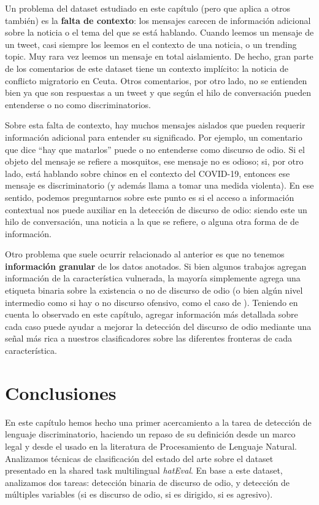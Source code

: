 
Un problema del dataset estudiado en este capítulo (pero que aplica a otros también) es la \textbf{falta de contexto}: los mensajes carecen de información adicional sobre la noticia o el tema del que se está hablando. Cuando leemos un mensaje de un tweet, casi siempre los leemos en el contexto de una noticia, o un trending topic. Muy rara vez leemos un mensaje en total aislamiento. De hecho, gran parte de los comentarios de este dataset tiene un contexto implícito: la noticia de conflicto migratorio en Ceuta. Otros comentarios, por otro lado, no se entienden bien ya que son respuestas a un tweet y que según el hilo de conversación pueden entenderse o no como discriminatorios.

Sobre esta falta de contexto, hay muchos mensajes aislados que pueden requerir información adicional para entender su significado. Por ejemplo, un comentario que dice ``hay que matarlos'' puede o no entenderse como discurso de odio. Si el objeto del mensaje se refiere a mosquitos, ese mensaje no es odioso; si, por otro lado, está hablando sobre chinos en el contexto del COVID-19, entonces ese mensaje es discriminatorio (y además llama a tomar una medida violenta). En ese sentido, podemos preguntarnos sobre este punto es si el acceso a información contextual nos puede auxiliar en la detección de discurso de odio: siendo este un hilo de conversación, una noticia a la que se refiere, o alguna otra forma de de información.

Otro problema que suele ocurrir relacionado al anterior es que no tenemos \textbf{información granular} de los datos anotados. Si bien algunos trabajos agregan información de la característica vulnerada, la mayoría simplemente agrega una etiqueta binaria sobre la existencia o no de discurso de odio (o bien algún nivel intermedio como si hay o no discurso ofensivo, como el caso de \citet{Davidson2017AutomatedHS}). Teniendo en cuenta lo observado en este capítulo, agregar información más detallada sobre cada caso puede ayudar a mejorar la detección del discurso de odio mediante una señal más rica a nuestros clasificadores sobre las diferentes fronteras de cada característica.


\section{Conclusiones}

En este capítulo hemos hecho una primer acercamiento a la tarea de detección de lenguaje discriminatorio, haciendo un repaso de su definición desde un marco legal y desde el usado en la literatura de Procesamiento de Lenguaje Natural. Analizamos técnicas de clasificación del estado del arte sobre el dataset presentado en la shared task multilingual \emph{hatEval}\cite{hateval2019semeval}. En base a este dataset, analizamos dos tareas: detección binaria de discurso de odio, y detección de múltiples variables (si es discurso de odio, si es dirigido, si es agresivo).

